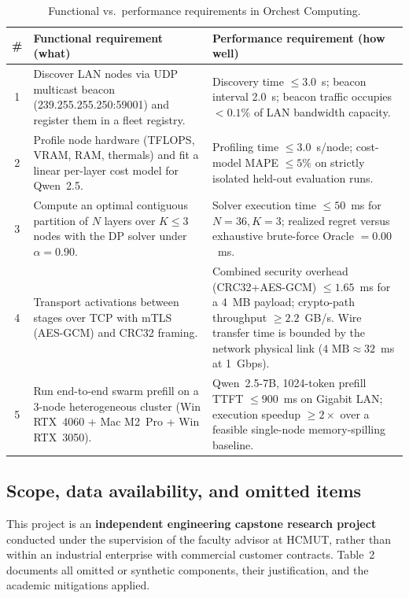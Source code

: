 \documentclass[10pt,a4paper]{article}
\newcommand{\code}[1]{{\ttfamily\footnotesize #1}}
\begin{document}
\begin{table}[H]
\centering\footnotesize
\caption{Functional vs.\ performance requirements in Orchest Computing.}
\begin{tabularx}{\textwidth}{@{}c Y Y@{}}
\toprule
\# & Functional requirement (what) & Performance requirement (how well)\\
 & Discover LAN nodes via UDP multicast beacon (\code{239.255.255.250:59001}) and register them in a fleet registry. & Discovery time $\le 3.0$~s; beacon interval 2.0~s; beacon traffic occupies $<0.1\%$ of LAN bandwidth capacity.\\
2 & Profile node hardware (TFLOPS, VRAM, RAM, thermals) and fit a linear per-layer cost model for Qwen~2.5. & Profiling time $\le 3.0$~s/node; cost-model MAPE $\le 5\%$ on strictly isolated held-out evaluation runs.\\
3 & Compute an optimal contiguous partition of $N$ layers over $K\le 3$ nodes with the DP solver under $\alpha=0.90$. & Solver execution time $\le 50$~ms for $N{=}36,K{=}3$; realized regret versus exhaustive brute-force Oracle $=0.00$~ms.\\
4 & Transport activations between stages over TCP with mTLS (AES-GCM) and CRC32 framing. & Combined security overhead (CRC32+AES-GCM) $\le 1.65$~ms for a 4~MB payload; crypto-path throughput $\ge 2.2$~GB/s. Wire transfer time is bounded by the network physical link ($4\text{~MB}\approx 32$~ms at 1~Gbps).\\
5 & Run end-to-end swarm prefill on a 3-node heterogeneous cluster (Win RTX~4060 + Mac M2~Pro + Win RTX~3050). & Qwen~2.5-7B, 1024-token prefill TTFT $\le 900$~ms on Gigabit LAN; execution speedup $\ge 2\times$ over a feasible single-node memory-spilling baseline.\\
\bottomrule
\end{tabularx}
\end{table}

\subsection{Scope, data availability, and omitted items}
This project is an \textbf{independent engineering capstone research project} conducted under the supervision of the faculty advisor at HCMUT, rather than within an industrial enterprise with commercial customer contracts. Table~2 documents all omitted or synthetic components, their justification, and the academic mitigations applied.
\end{document}

